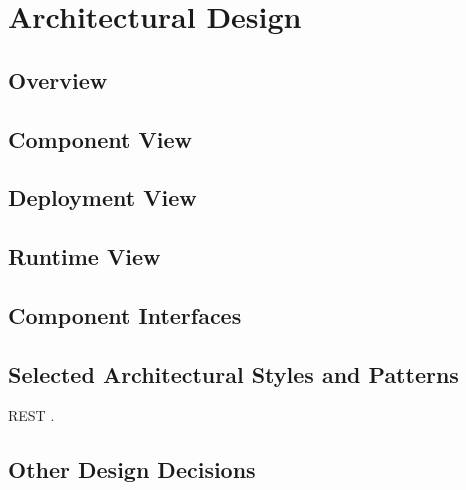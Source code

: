 \chapter{Architectural Design}

\section{Overview}

\section{Component View}

\section{Deployment View}

\section{Runtime View}

\section{Component Interfaces}

\section{Selected Architectural Styles and Patterns}

REST \cite{rest}.

\section{Other Design Decisions}